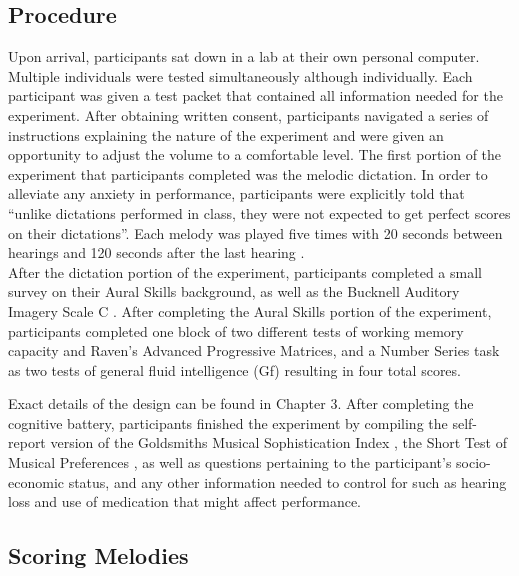 \documentclass[12pt,]{book}
\begin{document}
\hypertarget{procedure-1}{%
\subsection{Procedure}\label{procedure-1}}

Upon arrival, participants sat down in a lab at their own personal computer.
Multiple individuals were tested simultaneously although individually.
Each participant was given a test packet that contained all information needed for the experiment.
After obtaining written consent, participants navigated a series of instructions explaining the nature of the experiment and were given an opportunity to adjust the volume to a comfortable level.
The first portion of the experiment that participants completed was the melodic dictation.
In order to alleviate any anxiety in performance, participants were explicitly told that ``unlike dictations performed in class, they were not expected to get perfect scores on their dictations''.
Each melody was played five times with 20 seconds between hearings and 120 seconds after the last hearing \citep{paneyEffectDirectingAttention2016}.\\
After the dictation portion of the experiment, participants completed a small survey on their Aural Skills background, as well as the Bucknell Auditory Imagery Scale C \citep{halpernDifferencesAuditoryImagery2015}.
After completing the Aural Skills portion of the experiment, participants completed one block of two different tests of working memory capacity \citep{unsworthAutomatedVersionOperation2005} and Raven's Advanced Progressive Matrices, and a Number Series task as two tests of general fluid intelligence (Gf) \citep{ravenManualRavenProgressive1994, thurstonePrimaryMentalAbilities1938} resulting in four total scores.

Exact details of the design can be found in Chapter 3.
After completing the cognitive battery, participants finished the experiment by compiling the self-report version of the Goldsmiths Musical Sophistication Index \citep{mullensiefenMusicalityNonMusiciansIndex2014}, the Short Test of Musical Preferences \citep{rentfrowReMiEveryday2003}, as well as questions pertaining to the participant's socio-economic status, and any other information needed to control for such as hearing loss and use of medication that might affect performance.

\hypertarget{scoring-melodies}{%
\subsection{Scoring Melodies}\label{scoring-melodies}}
\end{document}
